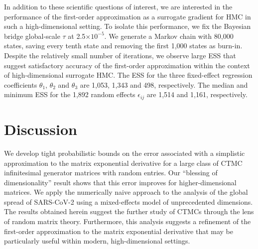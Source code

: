 \documentclass[9pt,twocolumn,twoside]{pnas-new}
\newcommand{\?}{\textbf{?}}
\begin{document}
In addition to these scientific questions of interest, we are
interested in the performance of the first-order approximation as a
surrogate gradient for HMC in such a high-dimensional setting. To
isolate this performance, we fix the Bayesian bridge global-scale
$\tau$ at 2.5$\times10^{-5}$.  We generate a Markov chain with 80,000
states, saving every tenth state and removing the first 1,000 states as
burn-in.  Despite the relatively small number of iterations, we
observe large ESS that suggest satisfactory accuracy of the
first-order approximation within the context of high-dimensional
surrogate HMC.  The ESS for the three fixed-effect regression
coefficients $\theta_1$, $\theta_2$ and $\theta_3$ are 1,053, 1,343
and 498, respectively.  The median and minimum ESS for the 1,892
random effects $\epsilon_{ij}$ are 1,514 and 1,161, respectively.


\section*{Discussion}

We develop tight probabilistic bounds on the error associated
with a simplistic approximation to the matrix exponential derivative
for a large class of CTMC infinitesimal generator matrices with random
entries.  Our ``blessing of dimensionality'' result shows that this
error improves for higher-dimensional matrices.  We apply the
numerically naive approach to the analysis of the global spread of
SARS-CoV-2 using a mixed-effects model of unprecedented dimensions.
The results obtained herein suggest the further study of CTMCs through
the lens of random matrix theory.  Furthermore, this analysis suggests a refinement of the first-order
approximation to the matrix exponential derivative that may be particularly useful within
modern, high-dimensional settings.





\showacknow{} %


\end{document}
